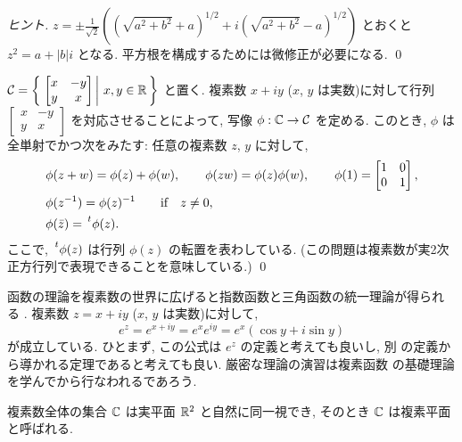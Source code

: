 \documentclass[12pt,twoside]{jarticle}
\begin{document}
\begin{proof}[ヒント]
 $z=\pm\frac{1}{\sqrt{2}}\left((\sqrt{a^2+b^2}+a)^{1/2}+i(\sqrt{a^2+b^2}-a)^{1/2}\right)$
 とおくと $z^2=a+|b|i$ となる.  平方根を構成するためには微修正が必要になる.
 \qed
\end{proof}


\begin{question}\label{q:fukusosu-gyoretsu-hyogen}
  \(
    \mathcal{C} =
    \left\{\,
    \left.
      \begin{bmatrix} x & - y \\ y & x \end{bmatrix}
    \,\right|\,
      x, y \in {\mathbb R}
    \,\right\}
  \)%
  と置く. 複素数 $x + iy$ ($x$, $y$ は実数)に対して行列
  \( \begin{bmatrix} x & - y \\ y & x \end{bmatrix} \)%
  を対応させることによって, 写像 $\phi : {\mathbb C} \to \cal{C}$ を定める.
  このとき, $\phi$ は全単射でかつ次をみたす: 任意の複素数 $z$, $y$ 
  に対して,
  \begin{align*}
    & \phi(z + w) = \phi(z) + \phi(w),
      \qquad
      \phi(zw) = \phi(z)\phi(w), 
      \qquad
      \phi(1) = \begin{bmatrix} 1 & 0 \\ 0 & 1 \end{bmatrix}, \\
    & \phi(z^{-1}) = \phi(z)^{-1} \qquad\text{if}\quad z \ne 0, \\
    & \phi(\bar z) = \transpose{\phi(z)}.
  \end{align*}
  ここで, $\transpose{\phi(z)}$ は行列 $\phi(z)$ の転置を表わしている. 
  (この問題は複素数が実2次正方行列で表現できることを意味している.) \qed
\end{question}

函数の理論を複素数の世界に広げると指数函数と三角函数の統一理論が得られ
る%
. %
%
複素数 $z = x + iy$ ($x$, $y$ は実数)に対して,
\[
  e^z = e^{x + iy} = e^x e^{iy} = e^x (\cos y + i \sin y)
\]%
が成立している. ひとまず, この公式は $e^z$ の定義と考えても良いし, 別
の定義から導かれる定理であると考えても良い. 厳密な理論の演習は複素函数
の基礎理論を学んでから行なわれるであろう.

複素数全体の集合 ${\mathbb C}$ は実平面 ${\mathbb R}^2$ と自然に同一視でき, そのとき 
${\mathbb C}$ は複素平面と呼ばれる.
\end{document}
